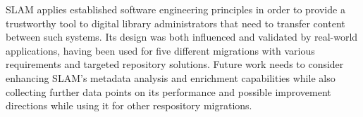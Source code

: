 SLAM applies established software engineering principles in order to provide a trustworthy tool to digital library administrators that need to transfer content between such systems. Its design was both influenced and validated by real-world applications, having been used for five different migrations with various requirements and targeted repository solutions. Future work needs to consider enhancing SLAM's metadata analysis and enrichment capabilities while also collecting further data points on its performance and possible improvement directions while using it for other respository migrations.